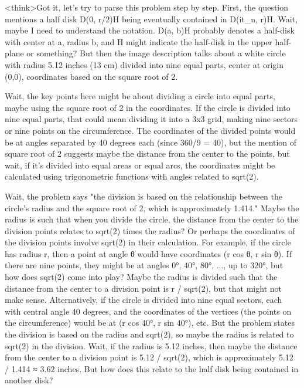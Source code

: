 <think>Got it, let's try to parse this problem step by step. First, the question mentions a half disk D(0, r/2)H being eventually contained in D(it_n, r)H. Wait, maybe I need to understand the notation. D(a, b)H probably denotes a half-disk with center at a, radius b, and H might indicate the half-disk in the upper half-plane or something? But then the image description talks about a white circle with radius 5.12 inches (13 cm) divided into nine equal parts, center at origin (0,0), coordinates based on the square root of 2. 

Wait, the key points here might be about dividing a circle into equal parts, maybe using the square root of 2 in the coordinates. If the circle is divided into nine equal parts, that could mean dividing it into a 3x3 grid, making nine sectors or nine points on the circumference. The coordinates of the divided points would be at angles separated by 40 degrees each (since 360/9 = 40), but the mention of square root of 2 suggests maybe the distance from the center to the points, but wait, if it's divided into equal areas or equal arcs, the coordinates might be calculated using trigonometric functions with angles related to sqrt(2). 

Wait, the problem says "the division is based on the relationship between the circle's radius and the square root of 2, which is approximately 1.414." Maybe the radius is such that when you divide the circle, the distance from the center to the division points relates to sqrt(2) times the radius? Or perhaps the coordinates of the division points involve sqrt(2) in their calculation. For example, if the circle has radius r, then a point at angle θ would have coordinates (r cos θ, r sin θ). If there are nine points, they might be at angles 0°, 40°, 80°, ..., up to 320°, but how does sqrt(2) come into play? Maybe the radius is divided such that the distance from the center to a division point is r / sqrt(2), but that might not make sense. Alternatively, if the circle is divided into nine equal sectors, each with central angle 40 degrees, and the coordinates of the vertices (the points on the circumference) would be at (r cos 40°, r sin 40°), etc. But the problem states the division is based on the radius and sqrt(2), so maybe the radius is related to sqrt(2) in the division. Wait, if the radius is 5.12 inches, then maybe the distance from the center to a division point is 5.12 / sqrt(2), which is approximately 5.12 / 1.414 ≈ 3.62 inches. But how does this relate to the half disk being contained in another disk? 


